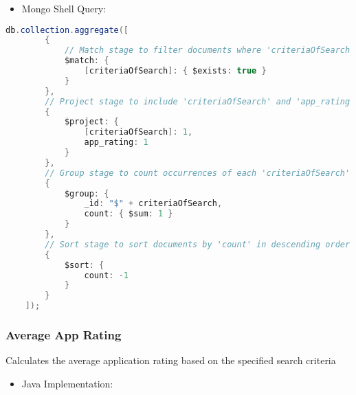 \begin{itemize}
    \item Mongo Shell Query:
\end{itemize}
\begin{mdframed}[style=customstyle]
\begin{lstlisting}[language=java]
    db.collection.aggregate([
        {
            // Match stage to filter documents where 'criteriaOfSearch' exists
            $match: {
                [criteriaOfSearch]: { $exists: true }
            }
        },
        // Project stage to include 'criteriaOfSearch' and 'app_rating' fields
        {
            $project: {
                [criteriaOfSearch]: 1,
                app_rating: 1
            }
        },
        // Group stage to count occurrences of each 'criteriaOfSearch'
        {
            $group: {
                _id: "$" + criteriaOfSearch,
                count: { $sum: 1 }
            }
        },
        // Sort stage to sort documents by 'count' in descending order
        {
            $sort: {
                count: -1
            }
        }
    ]);\end{lstlisting}
\end{mdframed} 

\subsubsection*{Average App Rating}

Calculates the average application rating based on the specified search criteria
\begin{itemize}
    \item Java Implementation:
\end{itemize}

